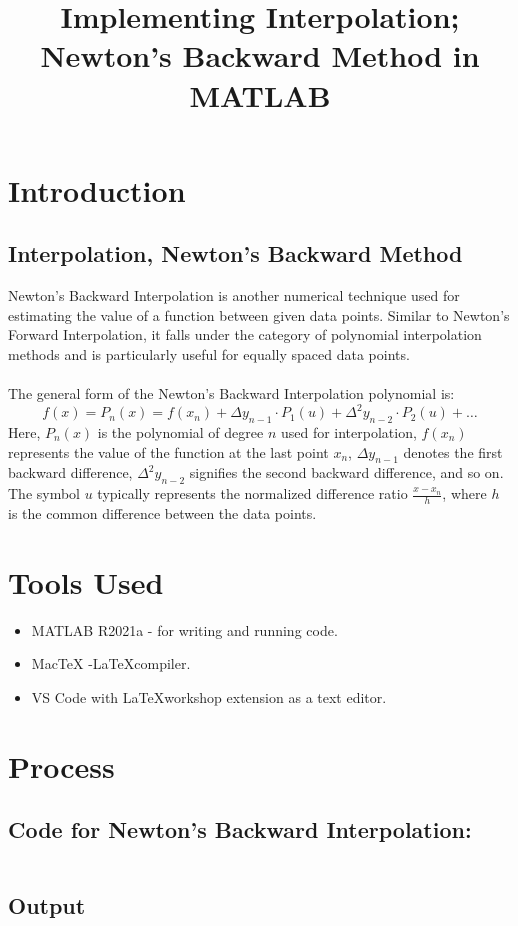 \clearpage
\title{Implementing Interpolation; Newton's Backward Method in MATLAB }
\author{}
\date{}
\maketitle

\section*{Introduction}
\subsection*{Interpolation, Newton's Backward Method}
Newton's Backward Interpolation is another numerical technique used for estimating the value of a function between given data points. Similar to Newton's Forward Interpolation, it falls under the category of polynomial interpolation methods and is particularly useful for equally spaced data points.\\\\
The general form of the Newton's Backward Interpolation polynomial is:
\[f(x) = P_n(x) = f(x_n) + \Delta y_{n-1} \cdot P_1(u) + \Delta^2 y_{n-2} \cdot P_2(u) + \ldots\]
Here, \(P_n(x)\) is the polynomial of degree \(n\) used for interpolation, \(f(x_n)\) represents the value of the function at the last point \(x_n\), \(\Delta y_{n-1}\) denotes the first backward difference, \(\Delta^2 y_{n-2}\) signifies the second backward difference, and so on. The symbol \(u\) typically represents the normalized difference ratio \(\frac{x - x_n}{h}\), where \(h\) is the common difference between the data points.


\section*{Tools Used}
\begin{itemize}
    \item MATLAB R2021a - for writing and running code.
    \item MacTeX -\LaTeX  compiler.
    \item VS Code with \LaTeX workshop extension as a text editor.
\end{itemize}

\section*{Process}

\subsection*{Code for Newton's Backward Interpolation:}
\begin{verbatim}

\end{verbatim}

\subsection*{Output}
\begin{center}
    \centering
\end{center}